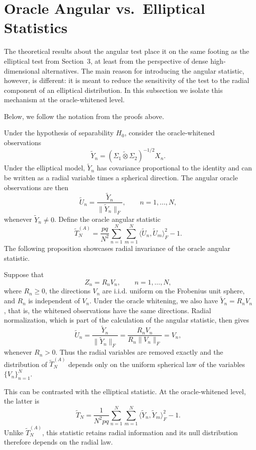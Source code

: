 \documentclass[12pt]{article}
\begin{document}
\section{Oracle Angular vs.~Elliptical Statistics}
\label{sec:oracle-angular-robustness}

The theoretical results about the angular test place it on the same footing as
the elliptical test from Section~3, at least from the perspective of dense high-dimensional
alternatives. The main reason for introducing the angular statistic, however, is different:
it is meant to reduce the sensitivity of the test to the radial component of an elliptical
distribution. In this subsection we isolate this mechanism at the oracle-whitened level.

Below, we follow the notation from the proofs above.

Under the hypothesis of separability \(H_0\), consider the oracle-whitened observations
\[
        \widetilde Y_n
        =
        (\Sigma_1\widetilde\otimes\Sigma_2)^{-1/2}X_n .
\]
Under the elliptical model, \(\widetilde Y_n\) has covariance proportional to the identity
and can be written as a radial variable times a spherical direction. The angular oracle
observations are then
\[
        \widetilde U_n
        =
        \frac{\widetilde Y_n}{\|\widetilde Y_n\|_F},
        \qquad n=1,\ldots,N,
\]
whenever \(\widetilde Y_n\neq 0\). Define the oracle angular statistic
\[
        \widetilde T_N^{(A)}
        =
        \frac{pq}{N^2}
        \sum_{n=1}^N\sum_{m=1}^N
        \bigl\langle \widetilde U_n,\widetilde U_m\bigr\rangle_F^2
        -1 .
\]
The following proposition showcases radial invariance of the oracle angular statistic.

Suppose that
\[
        Z_n = R_n V_n ,
        \qquad n=1,\ldots,N,
\]
where \(R_n\geq 0\), the directions \(V_n\) are i.i.d. uniform on the Frobenius unit sphere,
and \(R_n\) is independent of \(V_n\). Under the oracle whitening, we also have
\(\widetilde Y_n=R_n V_n\), that is, the whitened observations have the same directions.
Radial normalization, which is part of the calculation of the angular statistic, then gives
\[
        \widetilde U_n
        =
        \frac{\widetilde Y_n}{\|\widetilde Y_n\|_F}
        =
        \frac{R_n V_n}{R_n\|V_n\|_F}
        =
        V_n,
\]
whenever \(R_n>0\). Thus the radial variables are removed exactly and the distribution of
\(\widetilde T_N^{(A)}\) depends only on the uniform spherical law of the variables
\(\{V_n\}_{n=1}^N\).

This can be contrasted with the elliptical statistic. At the oracle-whitened level, the latter is
\[
        \widetilde T_N
        =
        \frac{1}{N^2pq}
        \sum_{n=1}^N\sum_{m=1}^N
        \langle \widetilde Y_n,\widetilde Y_m\rangle_F^2
        -1 .
\]
Unlike \(\widetilde T_N^{(A)}\), this statistic retains radial information and its null
distribution therefore depends on the radial law.
\end{document}
